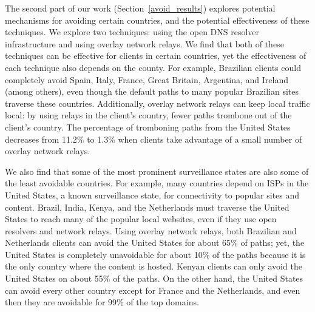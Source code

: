 The second part of our work (Section~\ref{avoid_results}) explores
potential mechanisms for avoiding certain countries, and the potential
effectiveness of these techniques.  We explore two techniques: using the
open DNS resolver infrastructure and using overlay network relays.  We
find that both of these techniques can be effective for clients in
certain countries, yet the effectiveness of each technique also depends
on the county.  For example, Brazilian clients could completely avoid
Spain, Italy, France, Great Britain, Argentina, and Ireland (among
others), even though the default paths to many popular Brazilian sites
traverse these countries. Additionally, overlay network relays can keep
local traffic local: by using relays in the client's country, fewer
paths trombone out of the client's country.  The percentage of
tromboning paths from the United States decreases from 11.2\% to 1.3\%
when clients take advantage of a small number of overlay network relays.

We also find that some of the most prominent surveillance states are
also some of the least avoidable countries.  For example, many countries
depend on ISPs in the United States, a known surveillance state, for
connectivity to popular sites and content. Brazil, India, Kenya, and
the Netherlands must traverse the United States to reach many of the
popular local websites, even if they use open resolvers and network
relays. Using overlay network relays, both Brazilian and Netherlands
clients can avoid the United States for about 65\% of paths; yet, the
United States is completely unavoidable for about 10\% of the paths
because it is the only country where the content is hosted.  Kenyan
clients can only avoid the United States on about 55\% of the paths.  On
the other hand, the United States can avoid every other country except
for France and the Netherlands, and even then they are avoidable for
99\% of the top domains.
